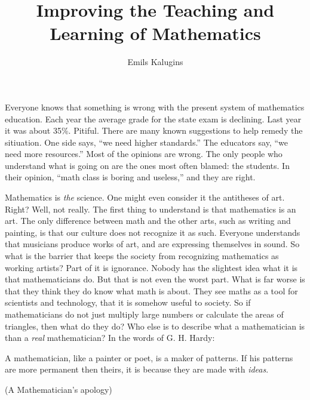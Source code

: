 \documentclass[a4paper,12pt]{article}
\author{Emils Kalugins}
\title{Improving the Teaching and Learning of Mathematics}
\date{}
\begin{document}
\maketitle

Everyone knows that something is wrong with the present system of mathematics
education. Each year the average grade for the state exam is declining. Last
year it was about 35\%. Pitiful. There are many known suggestions to help remedy the sitiuation. One side says, ``we need higher standards.'' The educators say, ``we
need more resources.'' Most of the opinions are wrong. The only
people who understand what is going on are the ones most often blamed: the
students. In their opinion, ``math class is boring and useless,'' and they are right.

Mathematics is \textit{the} science. One might even consider it the antitheses
of art. Right? Well, not really. The first thing to understand is that
mathematics is an art. The only difference between math and the other arts, such
as writing and painting, is that our culture does not recognize it as
such. Everyone understands that musicians produce works of art, and are
expressing themselves in sound. So what is the barrier that keeps the society
from recognizing mathematics as working artists? Part of it is ignorance. Nobody
has the slightest idea what it is that mathematicians do. But that is not even
the worst part. What is far worse is that they think they do know what math is
about. They see maths as a tool for scientists and technology, that it is
somehow useful to society. So if mathematicians do not just multiply large numbers
or calculate the areas of triangles, then what do they do? Who else is to
describe what a mathematician is than a \textit{real} mathematician? In the
words of G. H. Hardy:

\begin{center}

\begin{varwidth}{0.5\textwidth}
A mathematician, like a painter or poet, is a maker of patterns. If his patterns
are more permanent then theirs, it is because they are made with
\textit{ideas}.

\raggedleft
(A Mathematician's apology)
\end{varwidth}

\end{center}
\end{document}
